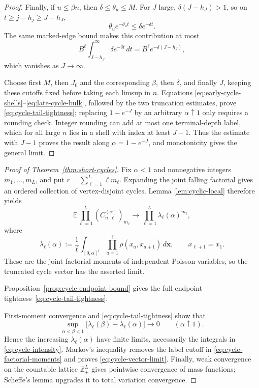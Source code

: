 \documentclass[11pt]{article}
\theoremstyle{remark}
\theoremstyle{plain}
\newcommand{\E}{\mathbb E}
\begin{document}
\begin{proof}
Finally, if $u\le\beta n$, then $\delta\le\theta_u\le M$.  For $J$ large,
$\delta(J-h_J)>1$, so on $t\ge j-h_j\ge J-h_J$,
\[
 \theta_u e^{-\theta_u t}\le\delta e^{-\delta t}.
\]
The same marked-edge bound makes this contribution at most
\begin{equation}\label{eq:late-cycle-bulk}
 B^\ell\int_{J-h_J}^\infty\delta e^{-\delta t}\,dt
 =B^\ell e^{-\delta(J-h_J)},
\end{equation}
which vanishes as $J\to\infty$.

Choose first $M$, then $J_0$ and the corresponding $\beta$, then $\delta$,
and finally $J$, keeping these cutoffs fixed before taking each limsup in
$n$.  Equations
\eqref{eq:early-cycle-shells}--\eqref{eq:late-cycle-bulk}, followed by the
two truncation estimates, prove \eqref{eq:cycle-tail-tightness}; replacing
$1-e^{-J}$ by an arbitrary $\alpha\uparrow1$ only requires a rounding check.
Integer rounding can add at most one terminal-depth label, which for all
large $n$ lies in a shell with index at least $J-1$.  Thus the estimate with
$J-1$ proves the result along $\alpha=1-e^{-J}$, and monotonicity gives the
general limit.
\end{proof}

\begin{proof}[Proof of Theorem~\ref{thm:short-cycles}]
Fix $\alpha<1$ and nonnegative integers $m_1,\ldots,m_L$, and put
$r=\sum_{\ell=1}^L\ell m_\ell$.  Expanding the joint falling factorial gives
an ordered collection of vertex-disjoint cycles.  Lemma
\ref{lem:cyclic-local} therefore yields
\begin{equation}\label{eq:cycle-factorial-moments}
 \E\prod_{\ell=1}^L(C_{n,\ell}^{(\alpha)})_{m_\ell}
 \longrightarrow
 \prod_{\ell=1}^L\lambda_\ell(\alpha)^{m_\ell},
\end{equation}
where
\[
 \lambda_\ell(\alpha):=\frac1\ell
 \int_{[0,\alpha]^\ell}
 \prod_{a=1}^\ell\rho(x_a,x_{a+1})\,d\boldsymbol x,
 \qquad x_{\ell+1}=x_1.
\]
These are the joint factorial moments of independent Poisson variables, so
the truncated cycle vector has the asserted limit.

Proposition~\ref{prop:cycle-endpoint-bound} gives the full endpoint
tightness~\eqref{eq:cycle-tail-tightness}.

First-moment convergence and \eqref{eq:cycle-tail-tightness} show that
\[
 \sup_{\alpha<\beta<1}
 \bigl[\lambda_\ell(\beta)-\lambda_\ell(\alpha)\bigr]
 \longrightarrow0
 \qquad(\alpha\uparrow1).
\]
Hence the increasing $\lambda_\ell(\alpha)$ have finite
limits, necessarily the integrals in \eqref{eq:cycle-intensity}.  Markov's
inequality removes the label cutoff in \eqref{eq:cycle-factorial-moments} and
proves \eqref{eq:cycle-vector-limit}.  Finally, weak convergence on the
countable lattice $\mathbb Z_+^L$ gives pointwise convergence of mass
functions; Scheffe's lemma upgrades it to total variation convergence.
\end{proof}
\end{document}
